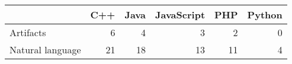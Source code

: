 \begin{tabular}{lrrrrr}
\toprule
{} &  C++ &  Java &  JavaScript &  PHP &  Python \\
\midrule
Artifacts        &    6 &     4 &           3 &    2 &       0 \\
Natural language &   21 &    18 &          13 &   11 &       4 \\
\bottomrule
\end{tabular}
